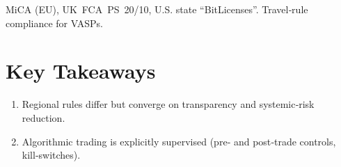 MiCA (EU), UK FCA PS 20/10, U.S. state “BitLicenses”.  
Travel‑rule compliance for VASPs.

\section*{Key Takeaways}
\begin{enumerate}
  \item Regional rules differ but converge on transparency and systemic‑risk
        reduction.
  \item Algorithmic trading is explicitly supervised (pre‑ and post‑trade
        controls, kill‑switches).
\end{enumerate}
